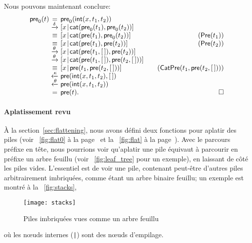 Nous pouvons maintenant conclure:
\begin{equation*}
\begin{array}{r@{\;}c@{\;}l@{\qquad}r}
\fun{pre}_0(t)
& = & \fun{pre}_0(\fun{int}(x,t_1,t_2))\\
& \xrightarrow{\smash{\delta}}
& \cons{x}{\fun{cat}(\fun{pre}_0(t_1), \fun{pre}_0(t_2))}\\
& \equiv & \cons{x}{\fun{cat}(\fun{pre}(t_1), \fun{pre}_0(t_2))}
& (\pred{Pre}{t_1})\\
& \equiv & \cons{x}{\fun{cat}(\fun{pre}(t_1), \fun{pre}(t_2))}
& (\pred{Pre}{t_2})\\
& \xrightarrow{\smash{\theta}}
& \cons{x}{\fun{cat}(\fun{pre}(t_1,\el), \fun{pre}(t_2))}\\
& \xrightarrow{\smash{\theta}}
& \cons{x}{\fun{cat}(\fun{pre}(t_1,\el), \fun{pre}(t_2,\el))}\\
& \equiv
& \cons{x}{\fun{pre}(t_1,\fun{pre}(t_2,\el))}
& (\pred{CatPre}{t_1,\fun{pre}(t_2,\el)})\\
& \xleftarrow{\smash{\kappa}}
& \fun{pre}(\fun{int}(x,t_1,t_2),\el)\\
& \xleftarrow{\smash{\theta}}
& \fun{pre}(\fun{int}(x,t_1,t_2))\\
& = & \fun{pre}(t). & \hfill\Box
\end{array}
\end{equation*}

\paragraph{Aplatissement revu}

À la section~\vref{sec:flattening}, nous avons défini deux fonctions
pour aplatir des piles (voir
\fig~\ref{fig:flat0} à la page~\pageref{fig:flat0} et la
\fig~\ref{fig:flat} à la page~\pageref{fig:flat}). Avec le parcours
préfixe en tête, nous pourrions voir qu'aplatir une pile équivaut à
parcourir en préfixe un arbre feuillu (voir \fig~\vref{fig:leaf_tree} pour un exemple), en
laissant de côté les piles vides. L'essentiel est de voir une pile,
contenant peut-être d'autres piles arbitrairement imbriquées, comme
étant un arbre binaire feuillu; un exemple est montré à la
\fig~\vref{fig:stacks},
\begin{figure}[b]
\centering
\texttt{[image: stacks]}
\caption{Piles imbriquées vues comme un arbre feuillu\label{fig:stacks}}
\end{figure}
où les n{\oe}uds internes (\texttt{|}) sont
des n{\oe}uds d'empilage.

